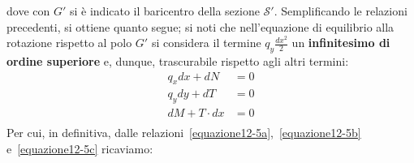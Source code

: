dove con $G'$ si è indicato il baricentro della sezione $\mathcal{S}'$. Semplificando le relazioni precedenti, si ottiene quanto segue; si noti che nell'equazione di equilibrio alla rotazione rispetto al polo $G'$ si considera il termine $q_{y}\frac{dx^2}{2}$ un \textbf{infinitesimo di ordine superiore} e, dunque, trascurabile rispetto agli altri termini:
\begin{subequations}
\begin{align} 
q_{x}dx + dN &= 0 \label{equazione12-5a} \tag{12.5a} \\
q_{y}dy + dT &= 0 \label{equazione12-5b} \tag{12.5b} \\
dM + T\cdot dx &= 0 \label{equazione12-5c} \tag{12.5c} \\
\end{align}
\end{subequations}
Per cui, in definitiva, dalle relazioni~\eqref{equazione12-5a},~\eqref{equazione12-5b} e~\eqref{equazione12-5c} ricaviamo:
\\

\\
\\

\\
\\

